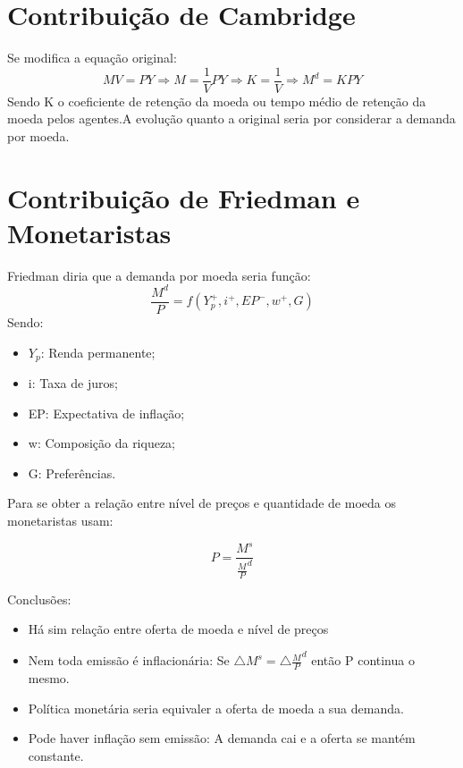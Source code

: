 \documentclass[12pt,a4paper,oneside,brazil]{abntex2}
\begin{document}
\section{Contribuição de Cambridge}
Se modifica a equação original:
\[MV = PY  \Rightarrow M = \frac{1}{V} P Y \Rightarrow K= \frac{1}{V} \Rightarrow M^d= K P Y\]
Sendo K o coeficiente de retenção da moeda ou tempo médio de retenção da moeda pelos agentes.A evolução quanto a original seria por considerar a demanda por moeda.\\

\section{Contribuição de Friedman e Monetaristas}
Friedman diria que a demanda por moeda seria função:
\[ \frac{M^d}{P} = f(Y^+_p , i^+ , EP^- , w^+ , G)\]
Sendo:
\begin{itemize}
\item $Y_p$: Renda permanente;
\item i: Taxa de juros;
\item EP: Expectativa de inflação;
\item w: Composição da riqueza;
\item G: Preferências.
\end{itemize}
Para se obter a relação entre nível de preços e quantidade de moeda os monetaristas usam:
\begin{large}
\[ P = \frac{M^s}{\frac{M}{P}^d}\]
\end{large}

Conclusões:
\begin{itemize}
\item Há sim relação entre oferta de moeda e nível de preços
\item Nem toda emissão é inflacionária: Se $\triangle M^s = \triangle \frac{M}{P}^d $ então P continua o mesmo.
\item Política monetária seria equivaler a oferta de moeda a sua demanda.
\item Pode haver inflação sem emissão: A demanda cai e a oferta se mantém constante.
\end{itemize}
\end{document}
